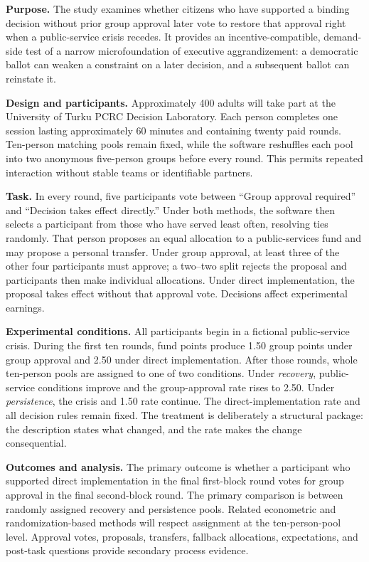 


\textbf{Purpose.} The study examines whether citizens who have supported a binding decision without prior group approval later vote to restore that approval right when a public-service crisis recedes. It provides an incentive-compatible, demand-side test of a narrow microfoundation of executive aggrandizement: a democratic ballot can weaken a constraint on a later decision, and a subsequent ballot can reinstate it.

\textbf{Design and participants.} Approximately 400 adults will take part at the University of Turku PCRC Decision Laboratory. Each person completes one session lasting approximately 60 minutes and containing twenty paid rounds. Ten-person matching pools remain fixed, while the software reshuffles each pool into two anonymous five-person groups before every round. This permits repeated interaction without stable teams or identifiable partners.

\textbf{Task.} In every round, five participants vote between ``Group approval required'' and ``Decision takes effect directly.'' Under both methods, the software then selects a participant from those who have served least often, resolving ties randomly. That person proposes an equal allocation to a public-services fund and may propose a personal transfer. Under group approval, at least three of the other four participants must approve; a two--two split rejects the proposal and participants then make individual allocations. Under direct implementation, the proposal takes effect without that approval vote. Decisions affect experimental earnings.

\textbf{Experimental conditions.} All participants begin in a fictional public-service crisis. During the first ten rounds, fund points produce 1.50 group points under group approval and 2.50 under direct implementation. After those rounds, whole ten-person pools are assigned to one of two conditions. Under \emph{recovery}, public-service conditions improve and the group-approval rate rises to 2.50. Under \emph{persistence}, the crisis and 1.50 rate continue. The direct-implementation rate and all decision rules remain fixed. The treatment is deliberately a structural package: the description states what changed, and the rate makes the change consequential.

\textbf{Outcomes and analysis.} The primary outcome is whether a participant who supported direct implementation in the final first-block round votes for group approval in the final second-block round. The primary comparison is between randomly assigned recovery and persistence pools. Related econometric and randomization-based methods will respect assignment at the ten-person-pool level. Approval votes, proposals, transfers, fallback allocations, expectations, and post-task questions provide secondary process evidence.

